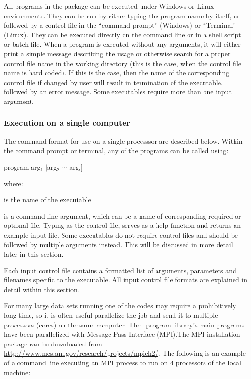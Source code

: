 All programs in the package can be executed under Windows or Linux environments. They can be run by either typing the program name by itself, or followed by a control file in the ``command prompt'' (Windows) or ``Terminal'' (Linux). They can be executed directly on the command line or in a shell script or batch file. When a program is executed without any arguments, it will either print a simple message describing the usage or otherwise search for a proper control file name in the working directory (this is the case, when the control file name is hard coded). If this is the case, then the name of the corresponding control file if changed by user will result in termination of the executable, followed by an error message. Some executables require more than one input argument.

\subsubsection{Execution on a single computer}

The command format for use on a single processsor are described below. Within the command prompt or terminal, any of the programs can be called using:
\begin{fileExample}
program arg$_1$ [arg$_2$ $\cdots$ arg$_i$]
\end{fileExample}
%
where:
\begin{description}[leftmargin=5cm, style=sameline, align=left]
\item[\codeName{program}] is the name of the executable
\item[\codeName{arg$_i$}] is a command line argument, which can be a name of corresponding required or optional file. Typing  as the control file, serves as a help function and returns an example input file. Some executables do not require control files and should be followed by multiple arguments instead. This will be discussed in more detail later in this section.
\end{description}

Each input control file contains a formatted list of arguments, parameters and filenames specific to the executable. All input control file formats are explained in detail within this section.

For many large data sets running one of the codes may require a prohibitively long time, so it is often useful parallelize the job and send it to multiple processors (cores) on the same computer. The \prog ~program library's main programs have been parallelized with Message Pass Interface (MPI).The MPI installation package can be downloaded from \url{http://www.mcs.anl.gov/research/projects/mpich2/}. The following is an example of a command line executing an MPI process to run  on 4 processors of the local machine:

